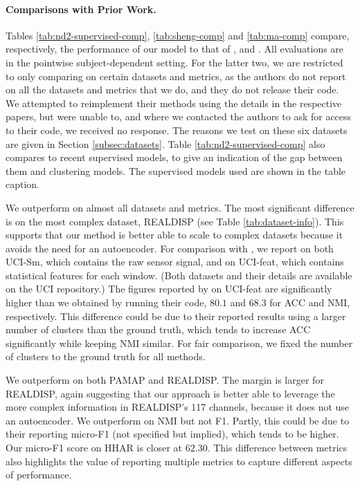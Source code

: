 \documentclass[wcp]{jmlr}
\begin{document}
\paragraph{Comparisons with Prior Work.}
Tables \ref{tab:nd2-supervised-comp}, \ref{tab:sheng-comp} and \ref{tab:ma-comp} compare, respectively, the performance of our model to that of \cite{mcconville2021n2d}, \cite{sheng2020unsupervised} and \cite{ma2021unsupervised}. All evaluations are  in the pointwise subject-dependent setting. For the latter two, we are restricted to only comparing on certain datasets and metrics, as the authors do not report on all the datasets and metrics that we do, and they do not release their code. We attempted to reimplement their methods using the details  in the respective papers, but were unable to, and where we contacted the authors to ask for access to their code, we received no response. The reasons we test on these six datasets are given in Section \ref{subsec:datasets}. Table \ref{tab:nd2-supervised-comp} also compares to recent supervised models, to give an indication of the gap between them and clustering models. The supervised models used are shown in the table caption. 

We outperform \citep{mcconville2021n2d} on almost all datasets and metrics. The most significant difference is on the most complex dataset, REALDISP (see Table \ref{tab:dataset-info}). This supports that our method is better able to scale to complex datasets because it avoids the need for an autoencoder. For comparison with \citep{mcconville2021n2d}, we report on both UCI-Sm, which contains the raw sensor signal, and on UCI-feat, which contains statistical features for each window. (Both datasets and their details are available on the UCI repository.) The figures reported by \cite{mcconville2021n2d} on UCI-feat are significantly higher than we obtained by running their code, $80.1$ and $68.3$ for ACC and NMI, respectively. This difference could be due to their reported results using a larger number of clusters than the ground truth, which tends to increase ACC significantly while keeping NMI similar. For fair comparison, we fixed the number of clusters to the ground truth for all methods.

We outperform \citep{sheng2020unsupervised} on both PAMAP and REALDISP. The margin is larger for REALDISP, again suggesting that our approach is better able to leverage the more complex information in REALDISP's 117 channels, because it does not use an autoencoder. We outperform \citep{ma2021unsupervised} on NMI but not F1. Partly, this could be due to their reporting micro-F1 (not specified but implied), which tends to be higher. Our micro-F1 score on HHAR is closer at $62.30$. This difference between metrics also highlights the value of reporting multiple metrics to capture different aspects of performance.
\end{document}
